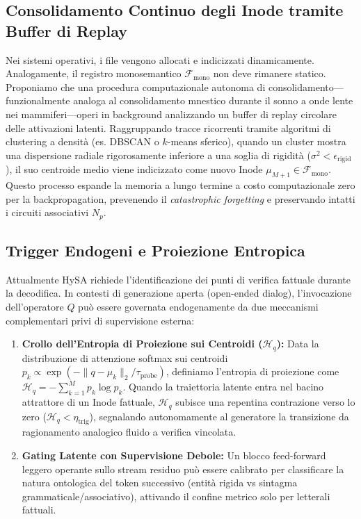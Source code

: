 \documentclass[11pt,a4paper]{article}
\theoremstyle{definition}
\begin{document}
\subsection{Consolidamento Continuo degli Inode tramite Buffer di Replay}
Nei sistemi operativi, i file vengono allocati e indicizzati dinamicamente. Analogamente, il registro monosemantico $\mathcal{F}_{\mathrm{mono}}$ non deve rimanere statico. Proponiamo che una procedura computazionale autonoma di consolidamento---funzionalmente analoga al consolidamento mnestico durante il sonno a onde lente nei mammiferi---operi in background analizzando un buffer di replay circolare delle attivazioni latenti. Raggruppando tracce ricorrenti tramite algoritmi di clustering a densità (es. DBSCAN o $k$-means sferico), quando un cluster mostra una dispersione radiale rigorosamente inferiore a una soglia di rigidità ($\sigma^2 < \epsilon_{\mathrm{rigid}}$), il suo centroide medio viene indicizzato come nuovo Inode $\mu_{M+1} \in \mathcal{F}_{\mathrm{mono}}$. Questo processo espande la memoria a lungo termine a costo computazionale zero per la backpropagation, prevenendo il \textit{catastrophic forgetting} e preservando intatti i circuiti associativi $N_p$.

\subsection{Trigger Endogeni e Proiezione Entropica}
Attualmente HySA richiede l'identificazione dei punti di verifica fattuale durante la decodifica. In contesti di generazione aperta (open-ended dialog), l'invocazione dell'operatore $Q$ può essere governata endogenamente da due meccanismi complementari privi di supervisione esterna:
\begin{enumerate}[leftmargin=*, itemsep=2.0pt]
    \item \textbf{Crollo dell'Entropia di Proiezione sui Centroidi ($\mathcal{H}_q$):} Data la distribuzione di attenzione softmax sui centroidi $p_k \propto \exp(-\|q - \mu_k\|_2 / \tau_{\mathrm{probe}})$, definiamo l'entropia di proiezione come $\mathcal{H}_q = -\sum_{k=1}^M p_k \log p_k$. Quando la traiettoria latente entra nel bacino attrattore di un Inode fattuale, $\mathcal{H}_q$ subisce una repentina contrazione verso lo zero ($\mathcal{H}_q < \eta_{\mathrm{trig}}$), segnalando autonomamente al generatore la transizione da ragionamento analogico fluido a verifica vincolata.
    \item \textbf{Gating Latente con Supervisione Debole:} Un blocco feed-forward leggero operante sullo stream residuo può essere calibrato per classificare la natura ontologica del token successivo (entità rigida vs sintagma grammaticale/associativo), attivando il confine metrico solo per letterali fattuali.
\end{enumerate}
\end{document}
